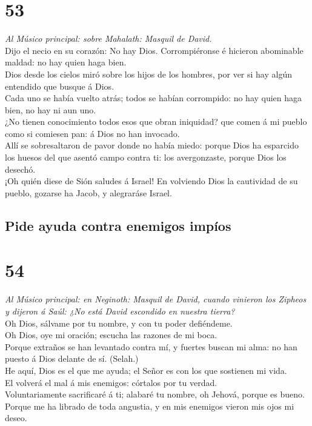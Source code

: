 \hypertarget{section-52}{%
\section{53}\label{section-52}}

 \emph{Al Músico principal: sobre Mahalath: Masquil de
David.}\\
Dijo el necio en su corazón: No hay Dios. Corrompiéronse é hicieron
abominable maldad: no hay quien haga bien.\\
 Dios desde los cielos miró sobre los hijos de los hombres,
por ver si hay algún entendido que busque á Dios.\\
 Cada uno se había vuelto atrás; todos se habían corrompido:
no hay quien haga bien, no hay ni aun uno.\\
 ¿No tienen conocimiento todos esos que obran iniquidad? que
comen á mi pueblo como si comiesen pan: á Dios no han invocado.\\
 Allí se sobresaltaron de pavor donde no había miedo: porque
Dios ha esparcido los huesos del que asentó campo contra ti: los
avergonzaste, porque Dios los desechó.\\
 ¡Oh quién diese de Sión saludes á Israel! En volviendo Dios
la cautividad de su pueblo, gozarse ha Jacob, y alegraráse Israel.

\hypertarget{pide-ayuda-contra-enemigos-impuxedos}{%
\subsection{Pide ayuda contra enemigos
impíos}\label{pide-ayuda-contra-enemigos-impuxedos}}

\hypertarget{section-53}{%
\section{54}\label{section-53}}

 \emph{Al Músico principal: en Neginoth: Masquil de David,
cuando vinieron los Zipheos y dijeron á Saúl: ¿No está David escondido
en nuestra tierra?}\\
Oh Dios, sálvame por tu nombre, y con tu poder defiéndeme.\\
 Oh Dios, oye mi oración; escucha las razones de mi boca.\\
 Porque extraños se han levantado contra mí, y fuertes
buscan mi alma: no han puesto á Dios delante de sí. (Selah.)\\
 He aquí, Dios es el que me ayuda; el Señor es con los que
sostienen mi vida.\\
 El volverá el mal á mis enemigos: córtalos por tu verdad.\\
 Voluntariamente sacrificaré á ti; alabaré tu nombre, oh
Jehová, porque es bueno.\\
 Porque me ha librado de toda angustia, y en mis enemigos
vieron mis ojos mi deseo.

